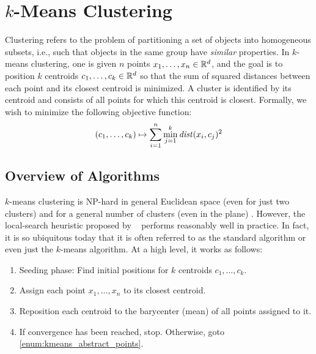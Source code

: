 
\chapter[k-Means Clustering]{$k$-Means Clustering}

Clustering refers to the problem of partitioning a set of objects into homogeneous subsets, i.e., such that objects in the same group have \emph{similar} properties. In $k$-means clustering,
one is given $n$ points $x_1, \dots, x_n \in \mathbb{R}^d$, and the goal is
to position $k$ centroids $c_1, \dots, c_k \in \mathbb{R}^d$ so that the sum of squared
distances between each point and its closest centroid is minimized. A cluster
is identified by its centroid and consists of all points for which this
centroid is closest. Formally, we wish to minimize the following objective
function:
\begin{gather*}
    (c_1, \dots, c_k) \mapsto \sum_{i=1}^n \min_{j=1}^k \mathit{dist}(x_i, c_j)^2
\end{gather*}

\section{Overview of Algorithms} \label{sec:kmeans:Algorithms}

$k$-means clustering is NP-hard in general Euclidean space (even for just two clusters) \cite{ADH09a} and for a general number of clusters (even in the plane) \cite{MNV10a}. However, the local-search heuristic proposed by \citeauthor{L82a}~\cite{L82a} performs reasonably well in practice. In fact, it is so ubiquitous today that it is often referred to as the standard algorithm or even just the $k$-means algorithm. At a high level, it works as follows:

\begin{enumerate}
	\item Seeding phase: Find initial positions for $k$ centroids $c_1, \dots, c_k$.
	\item Assign each point $x_1, \dots, x_n$ to its closest centroid. \label{enum:kmeans_abstract_points}
	\item Reposition each centroid to the barycenter (mean) of all points assigned to it.
	\item If convergence has been reached, stop. Otherwise, goto \eqref{enum:kmeans_abstract_points}.
\end{enumerate}

